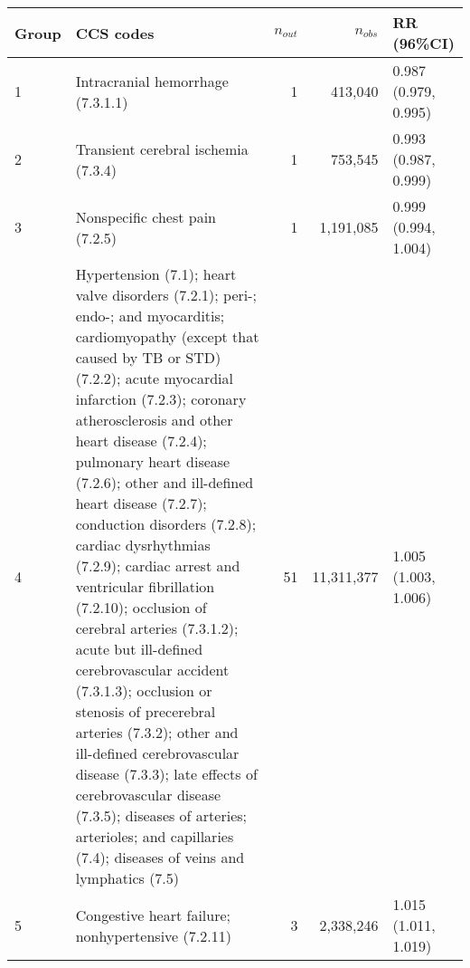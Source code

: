 \begin{tabular}{lp{6.5cm}rrp{2.2cm}}
  \hline
Group & CCS codes & $n_{out}$ & $n_{obs}$ & RR (96\%CI) \\ 
  \hline
   1 & Intracranial hemorrhage (7.3.1.1) &    1 & 413,040 & 0.987 (0.979, 0.995) \\ 
     2 & Transient cerebral ischemia (7.3.4) &    1 & 753,545 & 0.993 (0.987, 0.999) \\ 
     3 & Nonspecific chest pain (7.2.5) &    1 & 1,191,085 & 0.999 (0.994, 1.004) \\ 
     4 & Hypertension (7.1); heart valve disorders (7.2.1); peri-; endo-; and myocarditis; cardiomyopathy (except that caused by TB or STD) (7.2.2); acute myocardial infarction (7.2.3); coronary atherosclerosis and other heart disease (7.2.4); pulmonary heart disease (7.2.6); other and ill-defined heart disease (7.2.7); conduction disorders (7.2.8); cardiac dysrhythmias (7.2.9); cardiac arrest and ventricular fibrillation (7.2.10); occlusion of cerebral arteries (7.3.1.2); acute but ill-defined cerebrovascular accident (7.3.1.3); occlusion or stenosis of precerebral arteries (7.3.2); other and ill-defined cerebrovascular disease (7.3.3); late effects of cerebrovascular disease (7.3.5); diseases of arteries; arterioles; and capillaries (7.4); diseases of veins and lymphatics (7.5) &   51 & 11,311,377 & 1.005 (1.003, 1.006) \\ 
     5 & Congestive heart failure; nonhypertensive (7.2.11) &    3 & 2,338,246 & 1.015 (1.011, 1.019) \\ 
   \hline
\end{tabular}

